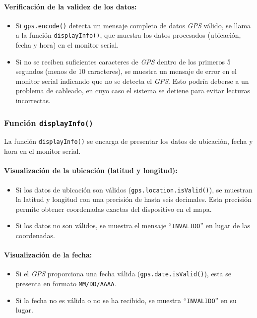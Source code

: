 \paragraph{Verificación de la validez de los datos:}
\begin{itemize}
    \item Si \texttt{gps.encode()} detecta un mensaje completo de datos \textit{GPS} válido, se llama a la función \texttt{displayInfo()}, que muestra los datos procesados (ubicación, fecha y hora) en el monitor serial.
    \item Si no se reciben suficientes caracteres de \textit{GPS} dentro de los primeros 5 segundos (menos de 10 caracteres), se muestra un mensaje de error en el monitor serial indicando que no se detecta el \textit{GPS}. Esto podría deberse a un problema de cableado, en cuyo caso el sistema se detiene para evitar lecturas incorrectas.
\end{itemize}

\subsubsection{Función \texttt{displayInfo()}}

La función \texttt{displayInfo()} se encarga de presentar los datos de ubicación, fecha y hora en el monitor serial.

\paragraph{Visualización de la ubicación (latitud y longitud):}
\begin{itemize}
    \item Si los datos de ubicación son válidos (\texttt{gps.location.isValid()}), se muestran la latitud y longitud con una precisión de hasta seis decimales. Esta precisión permite obtener coordenadas exactas del dispositivo en el mapa.
    \item Si los datos no son válidos, se muestra el mensaje “\texttt{INVALIDO}” en lugar de las coordenadas.
\end{itemize}

\paragraph{Visualización de la fecha:}
\begin{itemize}
    \item Si el \textit{GPS} proporciona una fecha válida (\texttt{gps.date.isValid()}), esta se presenta en formato \texttt{MM/DD/AAAA}.
    \item Si la fecha no es válida o no se ha recibido, se muestra “\texttt{INVALIDO}” en su lugar.
\end{itemize}

